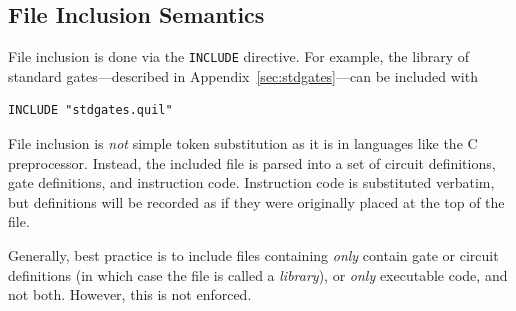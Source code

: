 \documentclass[conference]{IEEEtran}
\begin{document}
\subsection{File Inclusion Semantics}
File inclusion is done via the \verb|INCLUDE| directive. For example, the library of standard gates---described in Appendix~\ref{sec:stdgates}---can be included with
\begin{verbatim}
INCLUDE "stdgates.quil"
\end{verbatim}
File inclusion is \emph{not} simple token substitution as it is in languages like the C preprocessor. Instead, the included file is parsed into a set of circuit definitions, gate definitions, and instruction code. Instruction code is substituted verbatim, but definitions will be recorded as if they were originally placed at the top of the file.

Generally, best practice is to include files containing \emph{only} contain gate or circuit definitions (in which case the file is called a \emph{library}), or \emph{only} executable code, and not both. However, this is not enforced.
\end{document}
